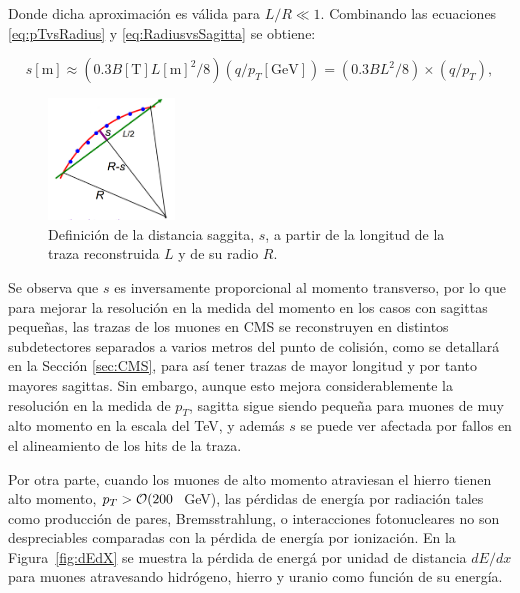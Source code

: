 Donde dicha aproximaci\'on es v\'alida para $L/R \ll 1$. Combinando las ecuaciones \eqref{eq:pTvsRadius} y \eqref{eq:RadiusvsSagitta} se obtiene:

\begin{equation}
  s[\text{m}]\approx (0.3 B [\text{T}] L[\text{m}]^{2}/8) (q/p_{T}[\text{GeV}]) =  (0.3 BL^{2}/8) \times (q/p_{T}),
\label{eq:SagittavsPt}
\end{equation}

\begin{figure}
\centering
\includegraphics[width=0.30\textwidth]{figures/curvaturesketch.png}
\caption{Definici\'on de la distancia saggita, $s$, a partir de la longitud de la traza reconstruida $L$ y de su radio $R$.}
\label{fig:SagittaDef}
\end{figure}

Se observa que $s$ es inversamente proporcional al momento transverso, por lo que para mejorar la resoluci\'on en la medida del momento en los casos con sagittas pequeñas, las trazas de los muones en CMS se reconstruyen en distintos subdetectores separados a varios metros del punto de colisi\'on, como se detallar\'a en la Secci\'on \ref{sec:CMS}, para as\'i tener trazas de mayor longitud y por tanto mayores sagittas. Sin embargo, aunque esto mejora considerablemente la resoluci\'on en la medida de $p_{T}$, sagitta sigue siendo pequeña para muones de muy alto momento en la escala del TeV, y adem\'as $s$ se puede ver afectada por fallos en el alineamiento de los hits de la traza.

Por otra parte, cuando los muones de alto momento atraviesan el hierro tienen alto momento, $p_{T} > {\cal O}(200~$ GeV), las p\'erdidas de energ\'ia por radiaci\'on tales como producci\'on de pares, Bremsstrahlung, o interacciones fotonucleares no son despreciables comparadas con la p\'erdida de energ\'ia por ionizaci\'on. En la Figura~\ref{fig:dEdX} se muestra la p\'erdida de energ\'a  por unidad de distancia $dE/dx$ para muones atravesando hidr\'ogeno, hierro y uranio como funci\'on de su energ\'ia.

